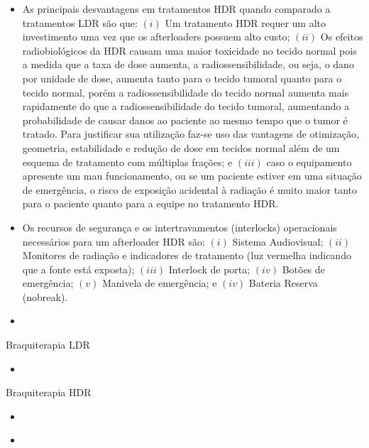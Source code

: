 \documentclass[11pt,a4paper]{article}
\newcounter{exemplo}
\begin{document}
\begin{exemplo}[8. Braquiterapia]
\begin{itemize}
        \item As principais desvantagens em tratamentos HDR quando comparado a tratamentos LDR são que: $(i)$ Um tratamento HDR requer um alto investimento uma vez que os afterloaders possuem alto custo; $(ii)$ Os efeitos radiobiológicos da HDR causam uma maior toxicidade no tecido normal pois a medida que a taxa de dose aumenta, a radiossensibilidade, ou seja, o dano por unidade de dose, aumenta tanto para o tecido tumoral quanto para o tecido normal, porém a radiossensibilidade do tecido normal aumenta mais rapidamente do que a radiossensibilidade do tecido tumoral, aumentando a probabilidade de causar danos ao paciente ao mesmo tempo que o tumor é tratado. Para justificar sua utilização faz-se uso das vantagens de otimização, geometria, estabilidade e redução de dose em tecidos normal além de um esquema de tratamento com múltiplas frações; e $(iii)$ caso o equipamento apresente um mau funcionamento, ou se um paciente estiver em uma situação de emergência, o risco de exposição acidental à radiação é muito maior tanto para o paciente quanto para a equipe no tratamento HDR.
        
        \item Os recursos de segurança e os intertravamentos (interlocks) operacionais necessários para um afterloader HDR são: $(i)$ Sistema Audiovisual; $(ii)$ Monitores de radiação e indicadores de tratamento (luz vermelha indicando que a fonte está exposta); $(iii)$ Interlock de porta;  $(iv)$ Botões de emergência; $(v)$ Manivela de emergência; e $(iv)$ Bateria Reserva (nobreak).
        
        \item 

    \end{itemize}

    \textcolor{CarnationPink}{Braquiterapia LDR}
    \begin{itemize}
        \item 
    \end{itemize}

    \textcolor{CarnationPink}{Braquiterapia HDR}
    \begin{itemize}
        \item 
    \end{itemize}
\end{exemplo}

\begin{exemplo}
    \begin{itemize}
        \item 
    \end{itemize}
\end{exemplo}
\end{document}
